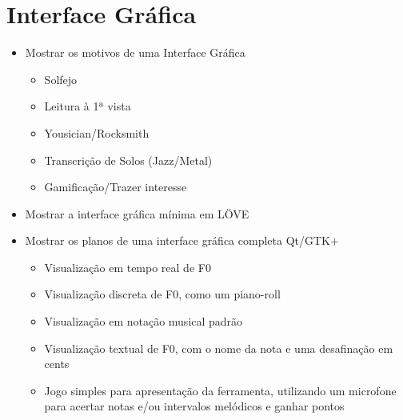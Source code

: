 \chapter{Interface Gráfica}
\label{cap:gui}

\begin{itemize}
\item Mostrar os motivos de uma Interface Gráfica
	\begin{itemize}
	\item Solfejo
	\item Leitura à 1ª vista 
	\item Yousician/Rocksmith
	\item Transcrição de Solos (Jazz/Metal)
	\item Gamificação/Trazer interesse
	\end{itemize}
\item Mostrar a interface gráfica mínima em LÖVE
\item Mostrar os planos de uma interface gráfica completa Qt/GTK+
\begin{itemize}
	\item Visualização em tempo real de F0
	\item Visualização discreta de F0, como um piano-roll
	\item Visualização em notação musical padrão
	\item Visualização textual de F0, com o nome da nota e uma desafinação em cents
	\item Jogo simples para apresentação da ferramenta, utilizando um microfone para acertar notas e/ou intervalos melódicos e ganhar pontos
	\end{itemize}
\end{itemize}
